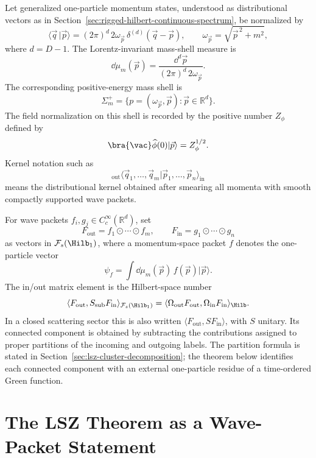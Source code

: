 \begin{definition}
\label{def:lsz-relativistic-external-normalization}
Let generalized one-particle momentum states, understood as distributional
vectors as in Section~\ref{sec:rigged-hilbert-continuous-spectrum}, be
normalized by
\[
  \langle \vec q\,|\vec p\rangle
  =
  (2\pi)^d\,2\omega_{\vec p}\,
  \delta^{(d)}(\vec q-\vec p),
  \qquad
  \omega_{\vec p}=\sqrt{\vec p^{\,2}+m^2},
\]
where \(d=D-1\). The Lorentz-invariant mass-shell measure is
\[
  \dd\mu_m(\vec p)
  =
  \frac{\dd^d\vec p}{(2\pi)^d\,2\omega_{\vec p}} .
\]
The corresponding positive-energy mass shell is
\[
  \Sigma_m^+
  =
  \{p=(\omega_{\vec p},\vec p):\vec p\in\mathbb R^d\}.
\]
The field normalization on this shell is recorded by the positive number
\(Z_\phi\) defined by
\[
  \bra{\vac}\widehat\phi(0)|\vec p\rangle=Z_\phi^{1/2}.
\]
Kernel notation such as
\[
  {}_{\mathrm{out}}\langle \vec q_1,\ldots,\vec q_m
  |\vec p_1,\ldots,\vec p_n\rangle_{\mathrm{in}}
\]
means the distributional kernel obtained after smearing all momenta with
smooth compactly supported wave packets.
\end{definition}

\begin{definition}
\label{def:lsz-wave-packet-scattering-matrix-element}
For wave packets \(f_i,g_j\in C_c^\infty(\mathbb R^d)\), set
\[
  F_{\mathrm{out}}=f_1\odot\cdots\odot f_m,
  \qquad
  F_{\mathrm{in}}=g_1\odot\cdots\odot g_n
\]
as vectors in \(\mathcal F_s(\Hilb_1)\), where a momentum-space packet \(f\)
denotes the one-particle vector
\[
  \psi_f=\int\dd\mu_m(\vec p)\,f(\vec p)|\vec p\rangle .
\]
The in/out matrix element is the Hilbert-space number
\[
  \langle F_{\mathrm{out}},S_{\mathrm{sub}} F_{\mathrm{in}}\rangle_{\mathcal F_s(\Hilb_1)}
  =
  \langle \Omega_{\mathrm{out}}F_{\mathrm{out}},
  \Omega_{\mathrm{in}}F_{\mathrm{in}}\rangle_{\Hilb}.
\]
In a closed scattering sector this is also written
\(\langle F_{\mathrm{out}},S F_{\mathrm{in}}\rangle\), with \(S\) unitary.
Its connected component is obtained by subtracting the contributions assigned
to proper partitions of the incoming and outgoing labels.  The partition
formula is stated in Section~\ref{sec:lsz-cluster-decomposition}; the theorem
below identifies each connected component with an external one-particle
residue of a time-ordered Green function.
\end{definition}

\section{The LSZ Theorem as a Wave-Packet Statement}

